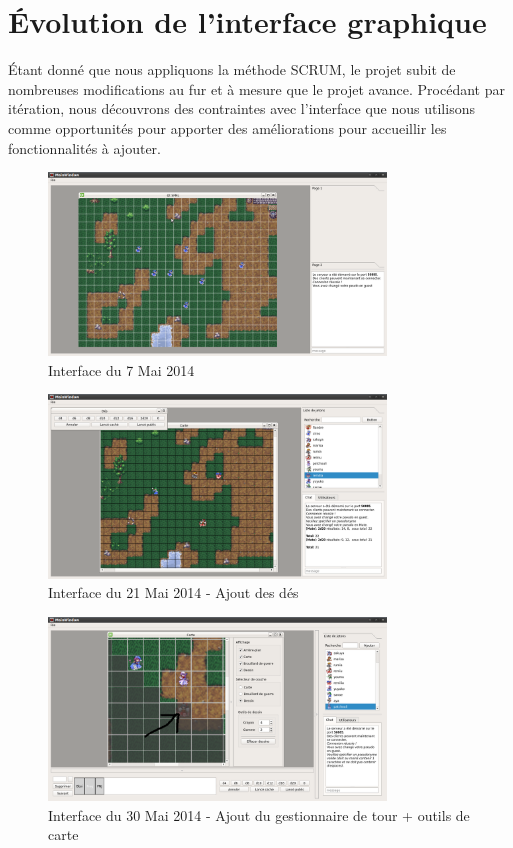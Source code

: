 \section{Évolution de l'interface graphique}

Étant donné que nous appliquons la méthode SCRUM, le projet subit de nombreuses modifications au fur et à mesure que le projet avance. Procédant par itération, nous découvrons des contraintes avec l'interface que nous utilisons comme opportunités pour apporter des améliorations pour accueillir les fonctionnalités à ajouter. 

\begin{figure}[h!]
	\centering
	\includegraphics[width=0.8\textwidth]{img/gui_history/2014_05_07_screen.png}
	\caption{Interface du 7 Mai 2014}
\end{figure}

\begin{figure}[h!]
	\centering
	\includegraphics[width=0.8\textwidth]{img/gui_history/2014_05_21_screen.png}
	\caption{Interface du 21 Mai 2014 - Ajout des dés}
\end{figure}
\newpage

\begin{figure}[h!]
	\centering
	\includegraphics[width=0.8\textwidth]{img/gui_history/2014_05_30_screen.png}
	\caption{Interface du 30 Mai 2014 - Ajout du gestionnaire de tour + outils de carte}
\end{figure}


